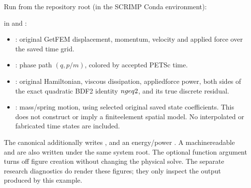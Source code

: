 \documentclass[letterpaper,10pt,english]{sphinxmanual}
\begin{document}
\begin{sphinxVerbatim}[commandchars=\\\{\}]
   
\end{sphinxVerbatim}

\sphinxAtStartPar
Run from the repository root (in the SCRIMP Conda environment):

\begin{sphinxVerbatim}[commandchars=\\\{\}]
\end{sphinxVerbatim}

\sphinxAtStartPar
{} in
 and
:
\begin{itemize}
\item {} 
\sphinxAtStartPar
{}: original GetFEM displacement,
momentum, velocity and applied force over the saved time grid.

\item {} 
\sphinxAtStartPar
{}: phase path
\((q,p/m)\), colored by accepted PETSc time.

\item {} 
\sphinxAtStartPar
{}: original Hamiltonian,
viscous dissipation, applied\sphinxhyphen{}force power, both sides of the
exact quadratic BDF2 identity  \(n\\geq2\),
and its true discrete residual.

\item {} 
\sphinxAtStartPar
{}:  mass/spring motion,
using selected original saved state coefficients. This does
not construct or imply a finite\sphinxhyphen{}element spatial model.
No interpolated or fabricated time states are included.

\end{itemize}

\sphinxAtStartPar
The canonical  additionally writes
,
 and an energy/power
. A machine\sphinxhyphen{}readable 
and 
are also written under the same system root. The optional  function argument
turns off figure creation without changing the physical solve.
The separate research diagnostics do  render these figures;
they only inspect the output produced by this example.
\end{document}
